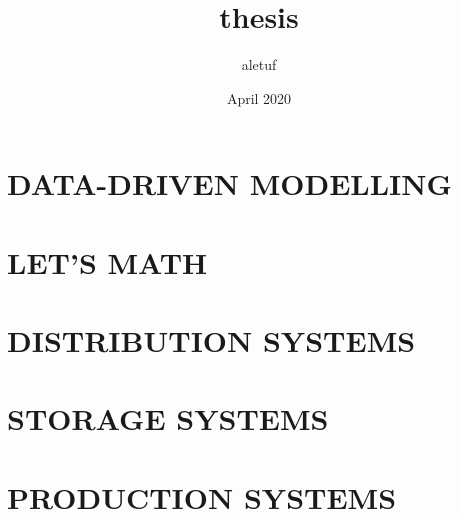 \documentclass{book}
\title{thesis}
\author{aletuf }
\date{April 2020}
\begin{document}
\frontmatter


%
%
%
%


\tableofcontents






\mainmatter

\part{DATA-DRIVEN MODELLING}





\part{LET'S MATH}












\part{DISTRIBUTION SYSTEMS}





\part{STORAGE SYSTEMS}





\part{PRODUCTION SYSTEMS}




\end{document}
